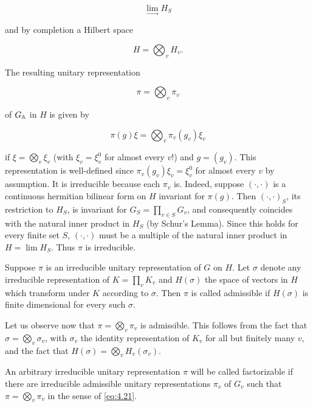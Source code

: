 \[
\lim_{\rightarrow} H_S
\]

and by completion a Hilbert space

\[
H = \bigotimes_v H_v.
\]

The resulting unitary representation

\begin{equation}\label{eq:4.21}
\pi = \bigotimes_v \pi_v\tag{4.21}
\end{equation}

of $G_{\mathbb{A}}$ in $H$ is given by

\begin{equation}\label{eq:4.22}
\pi(g)\xi = \bigotimes_v \pi_v(g_v)\xi_v\tag{4.22}
\end{equation}

if $\xi = \bigotimes_v \xi_v$ (with $\xi_v = \xi_v^0$ for almost every $v$!) and $g = (g_v)$. This representation is well-defined since $\pi_v(g_v)\xi_v = \xi_v^0$ for almost every $v$ by assumption. It is irreducible because each $\pi_v$ is. Indeed, suppose $(\cdot, \cdot)$ is a continuous hermitian bilinear form on $H$ invariant for $\pi(g)$. Then $(\cdot, \cdot)_S$, its restriction to $H_S$, is invariant for $G_S = \prod_{v \in S} G_v$, and consequently coincides with the natural inner product in $H_S$ (by Schur's Lemma). Since this holds for every finite set $S$, $(\cdot, \cdot)$ must be a multiple of the natural inner product in $H = \lim H_S$. Thus $\pi$ is irreducible.

\begin{definition}\label{def:4.28}

Suppose $\pi$ is an irreducible unitary representation of $G$ on $H$. Let $\sigma$ denote any irreducible representation of $K = \prod_v K_v$ and $H(\sigma)$ the space of vectors in $H$ which transform under $K$ according to $\sigma$. Then $\pi$ is called admissible if $H(\sigma)$ is finite dimensional for every such $\sigma$.

\end{definition}

Let us observe now that $\pi = \bigotimes_v \pi_v$ is admissible. This follows from the fact that $\sigma = \bigotimes_v \sigma_v$, with $\sigma_v$ the identity representation of $K_v$ for all but finitely many $v$, and the fact that $H(\sigma) = \bigotimes_v H_v(\sigma_v)$.

\begin{definition}\label{def:4.29}

An arbitrary irreducible unitary representation $\pi$ will be called factorizable if there are irreducible admissible unitary representations $\pi_v$ of $G_v$ such that $\pi = \bigotimes_v \pi_v$ in the sense of \eqref{eq:4.21}.

\end{definition}

